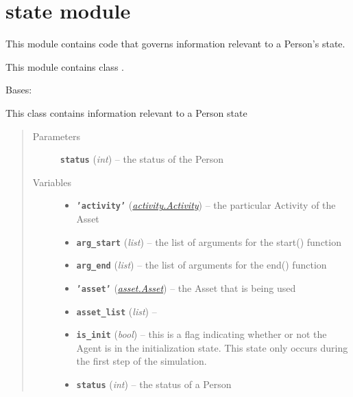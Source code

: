 \documentclass[letterpaper,10pt,english]{sphinxmanual}
\begin{document}
\section{state module}
\label{state::doc}\label{state:module-state}\label{state:state-module}
This module contains code that governs information relevant to a Person's state.

This module contains class {\hyperref[state:state.State]{\emph{}}}.

\begin{fulllineitems}
\label{state:state.State}
Bases: 

This class contains information relevant to a Person state
\begin{quote}\begin{description}
\item[{Parameters}] \leavevmode
\textbf{\texttt{status}} (\emph{int}) -- the status of the Person

\item[{Variables}] \leavevmode\begin{itemize}
\item {} 
\textbf{\texttt{'activity'}} ({\hyperref[activity:activity.Activity]{\emph{\emph{activity.Activity}}}}) -- the particular Activity of the Asset

\item {} 
\textbf{\texttt{arg\_start}} (\emph{list}) -- the list of arguments for the start() function

\item {} 
\textbf{\texttt{arg\_end}} (\emph{list}) -- the list of arguments for the end() function

\item {} 
\textbf{\texttt{'asset'}} ({\hyperref[asset:asset.Asset]{\emph{\emph{asset.Asset}}}}) -- the Asset that is being used

\item {} 
\textbf{\texttt{asset\_list}} (\emph{list}) -- 

\item {} 
\textbf{\texttt{is\_init}} (\emph{bool}) -- this is a flag indicating whether or not the Agent is in the initialization state.     This state only occurs during the first step of the simulation.

\item {} 
\textbf{\texttt{status}} (\emph{int}) -- the status of a Person


\end{itemize}
\end{description}
\end{quote}
\end{fulllineitems}
\end{document}
